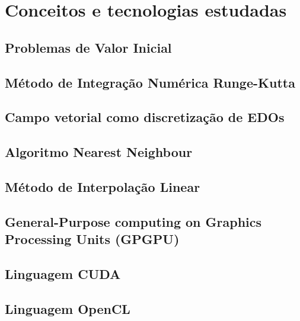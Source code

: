 \chapter{Conceitos e tecnologias estudadas}

\section{Problemas de Valor Inicial}
\section{Método de Integração Numérica Runge-Kutta}
\section{Campo vetorial como discretização de EDOs}
\section{Algoritmo Nearest Neighbour}
\section{Método de Interpolação Linear}
\section{General-Purpose computing on Graphics Processing Units (GPGPU)}
\section{Linguagem CUDA}
\section{Linguagem OpenCL}
